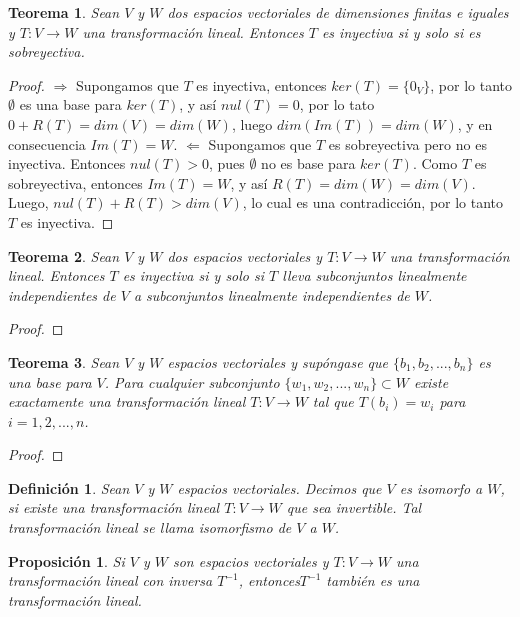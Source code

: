 \documentclass{book}
\newtheorem{theorem}{Teorema}
\newtheorem{proposition}{Proposición}
\newtheorem{definition}{Definición}
\begin{document}
\begin{theorem}
Sean $V$ y $W$ dos espacios vectoriales de dimensiones finitas e iguales y $T:V\rightarrow W$ una transformación lineal. Entonces $T$ es inyectiva si y solo si es sobreyectiva.
\end{theorem}

\begin{proof}
$\Rightarrow$ Supongamos que $T$ es inyectiva, entonces $ker(T)=\{0_V\}$, por lo tanto $\emptyset$ es una base para $ker(T)$, y así $nul(T)=0$, por lo tato $0+R(T)=dim(V)=dim(W)$, luego $dim(Im(T))=dim(W)$, y en consecuencia $Im(T)=W$.\newline 
$\Leftarrow$ Supongamos que $T$ es sobreyectiva pero no es inyectiva. Entonces $nul(T)>0$, pues $\emptyset$ no es base para $ker(T)$. Como $T$ es sobreyectiva, entonces $Im(T)=W$, y así $R(T)=dim(W)=dim(V)$. Luego, $nul(T)+R(T)>dim(V)$, lo cual es una contradicción, por lo tanto $T$ es inyectiva.
\end{proof}

\begin{theorem}
Sean $V$ y $W$ dos espacios vectoriales y $T:V\rightarrow W$ una transformación lineal. Entonces $T$ es inyectiva si y solo si $T$ lleva subconjuntos linealmente independientes de $V$ a subconjuntos linealmente independientes de $W$.
\end{theorem}

\begin{proof}

\end{proof}

\begin{theorem}
Sean $V$ y $W$ espacios vectoriales y supóngase que $\{b_1,b_2,...,b_n\}$ es una base para $V$. Para cualquier subconjunto $\{w_1,w_2,...,w_n\}\subset W$ existe exactamente una transformación lineal $T:V\rightarrow W$ tal que $T(b_i)=w_i$ para $i=1,2,...,n$.
\end{theorem}

\begin{proof}

\end{proof}

\begin{definition}
Sean $V$ y $W$ espacios vectoriales. Decimos que $V$ es isomorfo a $W$, si existe una transformación lineal $T:V \rightarrow W$ que sea invertible. Tal transformación lineal se llama isomorfismo de $V$ a $W$.
\end{definition}

\begin{proposition}
Si $V$ y $W$ son espacios vectoriales y $T:V\rightarrow W$ una transformación lineal con inversa $T^{-1}$, entonces$T^{-1}$ también es una transformación lineal.
\end{proposition}
\end{document}
